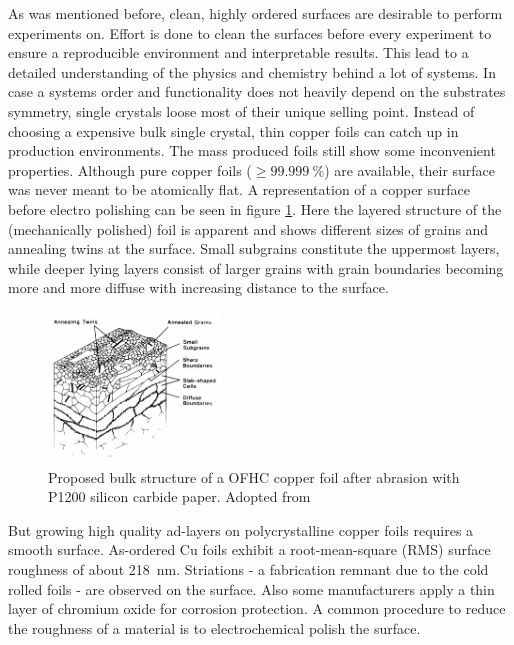 As was mentioned before, clean, highly ordered surfaces are desirable to perform experiments on. Effort is done to clean the surfaces before every experiment to ensure a reproducible environment and interpretable results. This lead to a detailed understanding of the physics and chemistry behind a lot of systems. In case a systems order and functionality does not heavily depend on the substrates symmetry, single crystals loose most of their unique selling point. Instead of choosing a expensive bulk single crystal, thin copper foils can catch up in production environments. The mass produced foils still show some inconvenient properties. Although pure copper foils ($\geq \SI{99.999}{\percent}$) are available, their surface was never meant to be atomically flat. 
A representation of a copper surface before electro polishing can be seen in figure \ref{fig:copper-foil-grains}. Here the layered structure of the (mechanically polished) foil is apparent and shows different sizes of grains and annealing twins at the surface. Small subgrains constitute the uppermost layers, while deeper lying layers consist of larger grains with grain boundaries becoming more and more diffuse with increasing distance to the surface.

%	


\begin{figure}
	\includegraphics[height=40mm]{./images/grain-structure-copper-foil}
	\caption{Proposed bulk structure of a OFHC copper foil after abrasion with P1200 silicon carbide paper. Adopted from \cite{turley_nature_19810}}
	\label{fig:copper-foil-grains}
\end{figure}

But growing high quality ad-layers on polycrystalline copper foils requires a smooth surface. As-ordered Cu foils exhibit a root-mean-square (RMS) surface roughness of about \SI{218}{\nm}\cite{bin_zhang_low-temperature_2012}. Striations - a fabrication remnant due to the cold rolled foils - are observed on the surface\cite{kim_synthesis_2012-1}. Also some manufacturers apply a thin layer of chromium oxide for corrosion protection\cite{bin_zhang_low-temperature_2012}. A common procedure to reduce the roughness of a material is to electrochemical polish the surface.

